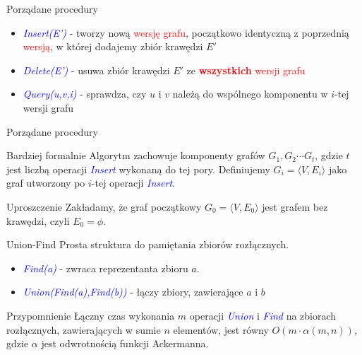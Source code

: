 \documentclass{beamer}
\newcommand{\emp}[1]{\textcolor{blue}{\textit{#1}}}
\newcommand{\red}[1]{\textcolor{red}{#1}}
\newcommand{\tuple}[2]{\langle #1 , #2 \rangle}
\begin{document}
\begin{frame}{Porządane procedury}

\begin{itemize}
\item \emp{Insert(E')} - tworzy nową \red{wersję grafu}, początkowo identyczną z poprzednią \red{wersją}, w której dodajemy zbiór krawędzi $E'$
\item \emp{Delete(E')} - usuwa zbiór krawędzi $E'$ ze \red{{\bf wszystkich} wersji grafu}
\item \emp{Query(u,v,i)} - sprawdza, czy $u$ i $v$ należą do wspólnego komponentu w $i$-tej wersji grafu
\end{itemize}

\end{frame}

\begin{frame}{Porządane procedury}
\begin{block}{Bardziej formalnie}
Algorytm zachowuje komponenty grafów $G_1,G_2 \cdots G_t$, gdzie $t$ jest liczbą operacji \emp{Insert} wykonaną do tej pory. Definiujemy $G_i=\tuple{V}{E_i}$ jako graf utworzony po $i$-tej operacji \emp{Insert}.
\end{block}

\begin{block}{Uproszczenie}
Zakładamy, że graf początkowy $G_0=\tuple{V}{E_0}$ jest grafem bez krawędzi, czyli $E_0 = \phi$. 
\end{block}
\end{frame}

\begin{frame}{Union-Find}
Prosta struktura do pamiętania zbiorów rozłącznych.
\begin{itemize}
\item \emp{Find(a)} - zwraca reprezentanta zbioru $a$. 
\item \emp{Union(Find(a),Find(b))} - łączy zbiory, zawierające $a$ i $b$
\end{itemize}
\begin{block}{Przypomnienie}
Łączny czas wykonania $m$ operacji \emp{Union} i \emp{Find} na zbiorach rozłącznych, zawierających w sumie $n$ elementów, jest równy $O(m\cdot\alpha(m,n))$, gdzie $\alpha$ jest odwrotnością funkcji Ackermanna.
\end{block}
\end{frame}
\end{document}
